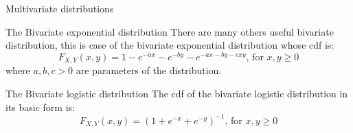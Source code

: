 \documentclass[8pt]{beamer}
\renewcommand{\emph}[1]{\textcolor{myorange}{#1}}
\begin{document}
\begin{frame}{Multivariate distributions} 
    \begin{block}{The \alert{Bivariate exponential} distribution}
        There are many others useful bivariate distribution, this is case of the \alert{bivariate exponential distribution} whose \emph{cdf} is:
        \[
            F_{X,Y} (x,y) = 1-e^{-ax} - e^{-by} - e^{-ax - by - cxy}, \, \text{for } x,y \geq 0 
        \]
        where $a,b,c > 0$ are parameters of the distribution. 
   \end{block}
 \begin{block}{The \alert{Bivariate logistic} distribution}
     The \emph{cdf} of the \alert{bivariate logistic distribution} in its basic form is:
        \[
            F_{X,Y} (x,y) = \left( 1 + e^{-x} + e^{-y} \right)^{-1}, \, \text{for } x,y \geq 0
        \]
   \end{block}

        \end{frame}
\end{document}
